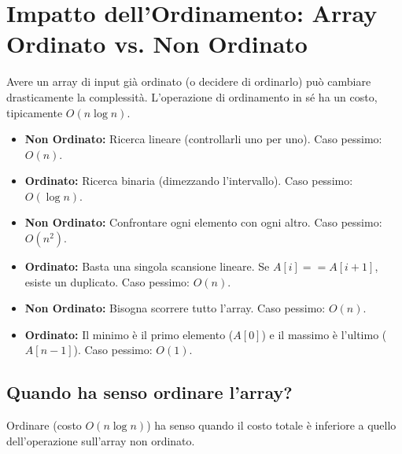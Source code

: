 \section{Impatto dell'Ordinamento: Array Ordinato vs. Non Ordinato}
Avere un array di input già ordinato (o decidere di ordinarlo) può cambiare drasticamente la complessità. L'operazione di ordinamento in sé ha un costo, tipicamente $O(n \log n)$.

\begin{example}
\begin{itemize}
    \item \textbf{Non Ordinato:} Ricerca lineare (controllarli uno per uno). Caso pessimo: $O(n)$.
    \item \textbf{Ordinato:} Ricerca binaria (dimezzando l'intervallo). Caso pessimo: $O(\log n)$.
\end{itemize}
\end{example}

\begin{example}
\begin{itemize}
    \item \textbf{Non Ordinato:} Confrontare ogni elemento con ogni altro. Caso pessimo: $O(n^2)$.
    \item \textbf{Ordinato:} Basta una singola scansione lineare. Se $A[i] == A[i+1]$, esiste un duplicato. Caso pessimo: $O(n)$.
\end{itemize}
\end{example}

\begin{example}
\begin{itemize}
    \item \textbf{Non Ordinato:} Bisogna scorrere tutto l'array. Caso pessimo: $O(n)$.
    \item \textbf{Ordinato:} Il minimo è il primo elemento ($A[0]$) e il massimo è l'ultimo ($A[n-1]$). Caso pessimo: $O(1)$.
\end{itemize}
\end{example}

\subsection{Quando ha senso ordinare l'array?}
Ordinare (costo $O(n \log n)$) ha senso quando il costo totale è inferiore a quello dell'operazione sull'array non ordinato.

